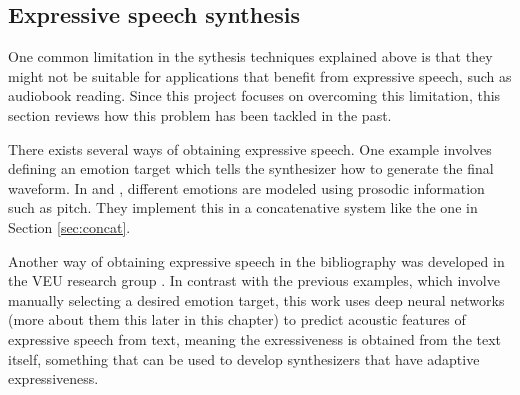 \subsection{Expressive speech synthesis}

One common limitation in the sythesis techniques explained above is that they might not be suitable for applications that benefit from expressive speech, such as audiobook reading. Since this project focuses on overcoming this limitation, this section reviews how this problem has been tackled in the past.

There exists several ways of obtaining expressive speech. One example involves defining an emotion target which tells the synthesizer how to generate the final waveform. In \cite{bulut2002expressive} and \cite{eide2004corpus}, different emotions are modeled using prosodic information such as pitch. They implement this in a concatenative system like the one in Section \ref{sec:concat}. 

Another way of obtaining expressive speech in the bibliography was developed in the VEU research group \cite{jauk2016acoustic}. In contrast with the previous examples, which involve manually selecting a desired emotion target, this work uses deep neural networks (more about them this later in this chapter) to predict acoustic features of expressive speech from text, meaning the exressiveness is obtained from the text itself, something that can be used to develop synthesizers that have adaptive expressiveness.



